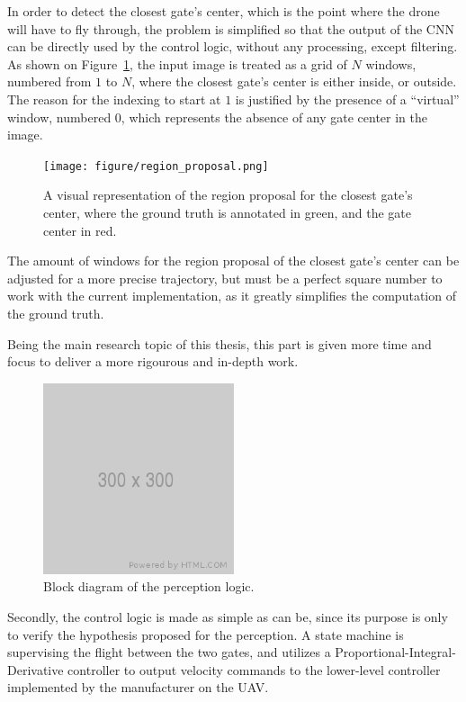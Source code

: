 In order to detect the closest gate's center, which is the point where the
drone will have to fly through, the problem is simplified so that the output of
the CNN can be directly used by the control logic, without any processing,
except filtering. As shown on Figure~\ref{fig:regionproposal}, the input image
is treated as a grid of $N$ windows, numbered from $1$ to $N$, where the
closest gate's center is either inside, or outside. The reason for the indexing
to start at $1$ is justified by the presence of a ``virtual'' window, numbered
$0$, which represents the absence of any gate center in the image.

\begin{figure}[h]
	\center
	\texttt{[image: figure/region\_proposal.png]}
	\caption{A visual representation of the region proposal for the closest
			gate's center, where the ground truth is annotated in green, and
			the gate center in red.}
	\label{fig:regionproposal}
\end{figure}

The amount of windows for the region proposal of the closest gate's center can
be adjusted for a more precise trajectory, but must be a perfect square number
to work with the current implementation, as it greatly simplifies the
computation of the ground truth.

Being the main research topic of this thesis, this part is given more time and
focus to deliver a more rigourous and in-depth work.\\

\begin{figure}[h]
	\centering
	\includegraphics[width=0.5\textwidth]{figure/300x300.png}
	\caption{Block diagram of the perception logic.}
	\label{fig:perception-block}
\end{figure}

Secondly, the control logic is made as simple as can be, since its purpose is
only to verify the hypothesis proposed for the perception. A state machine is
supervising the flight between the two gates, and utilizes a
Proportional-Integral-Derivative controller to output velocity commands to the
lower-level controller implemented by the manufacturer on the UAV.\\

